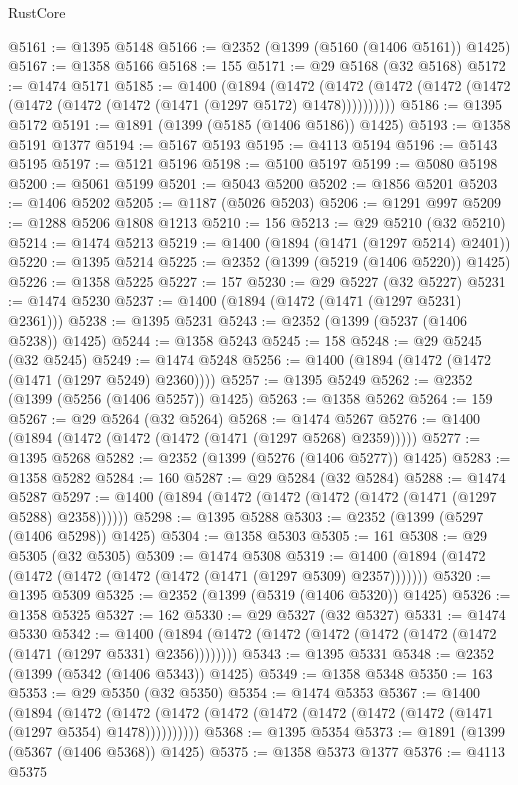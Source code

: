 \begin{lexlean}{RustCore}
\begin{coremodule}
@5161 := @1395 @5148
@5166 := @2352 (@1399 (@5160 (@1406 @5161)) @1425)
@5167 := @1358 @5166
@5168 := 155
@5171 := @29 @5168 (@32 @5168)
@5172 := @1474 @5171
@5185 := @1400
    (@1894
      (@1472 (@1472 (@1472 (@1472 (@1472 (@1472 (@1472 (@1472 (@1471 (@1297 @5172) @1478))))))))))
@5186 := @1395 @5172
@5191 := @1891 (@1399 (@5185 (@1406 @5186)) @1425)
@5193 := @1358 @5191 @1377
@5194 := @5167 @5193
@5195 := @4113 @5194
@5196 := @5143 @5195
@5197 := @5121 @5196
@5198 := @5100 @5197
@5199 := @5080 @5198
@5200 := @5061 @5199
@5201 := @5043 @5200
@5202 := @1856 @5201
@5203 := @1406 @5202
@5205 := @1187 (@5026 @5203)
@5206 := @1291 @997
@5209 := @1288 @5206 @1808 @1213
@5210 := 156
@5213 := @29 @5210 (@32 @5210)
@5214 := @1474 @5213
@5219 := @1400 (@1894 (@1471 (@1297 @5214) @2401))
@5220 := @1395 @5214
@5225 := @2352 (@1399 (@5219 (@1406 @5220)) @1425)
@5226 := @1358 @5225
@5227 := 157
@5230 := @29 @5227 (@32 @5227)
@5231 := @1474 @5230
@5237 := @1400 (@1894 (@1472 (@1471 (@1297 @5231) @2361)))
@5238 := @1395 @5231
@5243 := @2352 (@1399 (@5237 (@1406 @5238)) @1425)
@5244 := @1358 @5243
@5245 := 158
@5248 := @29 @5245 (@32 @5245)
@5249 := @1474 @5248
@5256 := @1400 (@1894 (@1472 (@1472 (@1471 (@1297 @5249) @2360))))
@5257 := @1395 @5249
@5262 := @2352 (@1399 (@5256 (@1406 @5257)) @1425)
@5263 := @1358 @5262
@5264 := 159
@5267 := @29 @5264 (@32 @5264)
@5268 := @1474 @5267
@5276 := @1400 (@1894 (@1472 (@1472 (@1472 (@1471 (@1297 @5268) @2359)))))
@5277 := @1395 @5268
@5282 := @2352 (@1399 (@5276 (@1406 @5277)) @1425)
@5283 := @1358 @5282
@5284 := 160
@5287 := @29 @5284 (@32 @5284)
@5288 := @1474 @5287
@5297 := @1400 (@1894 (@1472 (@1472 (@1472 (@1472 (@1471 (@1297 @5288) @2358))))))
@5298 := @1395 @5288
@5303 := @2352 (@1399 (@5297 (@1406 @5298)) @1425)
@5304 := @1358 @5303
@5305 := 161
@5308 := @29 @5305 (@32 @5305)
@5309 := @1474 @5308
@5319 := @1400 (@1894 (@1472 (@1472 (@1472 (@1472 (@1472 (@1471 (@1297 @5309) @2357)))))))
@5320 := @1395 @5309
@5325 := @2352 (@1399 (@5319 (@1406 @5320)) @1425)
@5326 := @1358 @5325
@5327 := 162
@5330 := @29 @5327 (@32 @5327)
@5331 := @1474 @5330
@5342 := @1400 (@1894 (@1472 (@1472 (@1472 (@1472 (@1472 (@1472 (@1471 (@1297 @5331) @2356))))))))
@5343 := @1395 @5331
@5348 := @2352 (@1399 (@5342 (@1406 @5343)) @1425)
@5349 := @1358 @5348
@5350 := 163
@5353 := @29 @5350 (@32 @5350)
@5354 := @1474 @5353
@5367 := @1400
    (@1894
      (@1472 (@1472 (@1472 (@1472 (@1472 (@1472 (@1472 (@1472 (@1471 (@1297 @5354) @1478))))))))))
@5368 := @1395 @5354
@5373 := @1891 (@1399 (@5367 (@1406 @5368)) @1425)
@5375 := @1358 @5373 @1377
@5376 := @4113 @5375

\end{coremodule}
\end{lexlean}
